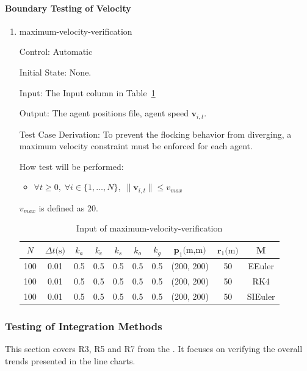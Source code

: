 \documentclass[12pt, titlepage]{article}
\begin{document}
\paragraph{Boundary Testing of Velocity}

\begin{enumerate}

\item{maximum-velocity-verification\\} \label{maxVTest}

Control: Automatic
					
Initial State: None.
					
Input: The Input column in Table~\ref{TblBoundTest1}
					
Output: The agent positions file, agent speed $\mathbf{v}_{i,t}$.

Test Case Derivation: To prevent the flocking behavior from diverging, a 
maximum velocity constraint must be enforced for each agent.

How test will be performed: 
\begin{itemize}
\item $\forall t \ge 0,\; \forall i \in \{1,\dots,N\},\; \|\mathbf{v}_{i,t}\| \le v_{max}$
\end{itemize}
$v_{max}$ is defined as 20.

\begin{longtable}{c c c c c c c c c c}
\caption{Input of maximum-velocity-verification} \label{TblBoundTest1} \\
\hline
$N$ & ${\Delta t}\text{(s)}$ & $k_a$ & $k_c$ & $k_s$ & $k_o$ & $k_g$ & $\mathbf{p}_1\text{(m,m)}$ & $\mathbf{r}_1\text{(m)}$ & $\mathbf{M}$ \\
\hline
100 & 0.01 & 0.5 & 0.5 & 0.5 & 0.5 & 0.5 & (200, 200) & 50 & EEuler \\
100 & 0.01 & 0.5 & 0.5 & 0.5 & 0.5 & 0.5 & (200, 200) & 50 & RK4 \\
100 & 0.01 & 0.5 & 0.5 & 0.5 & 0.5 & 0.5 & (200, 200) & 50 & SIEuler \\
\hline
\end{longtable}
\end{enumerate}

\subsubsection{Testing of Integration Methods} \label{methodTest}

This section covers R3, R5 and R7 from the \citet{SRS}. It focuses on 
verifying the overall trends presented in the line charts.
\end{document}
